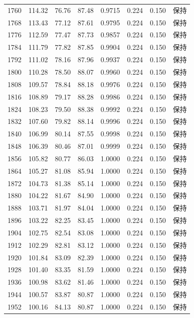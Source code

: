 \begin{longtable}{rrrrrrrr}
1760 & 114.32 & 76.76 & 87.48 & 0.9715 & 0.224 & 0.150 & 保持 \\
1768 & 113.43 & 77.12 & 87.61 & 0.9795 & 0.224 & 0.150 & 保持 \\
1776 & 112.59 & 77.47 & 87.73 & 0.9857 & 0.224 & 0.150 & 保持 \\
1784 & 111.79 & 77.82 & 87.85 & 0.9904 & 0.224 & 0.150 & 保持 \\
1792 & 111.02 & 78.16 & 87.96 & 0.9937 & 0.224 & 0.150 & 保持 \\
1800 & 110.28 & 78.50 & 88.07 & 0.9960 & 0.224 & 0.150 & 保持 \\
1808 & 109.57 & 78.84 & 88.18 & 0.9976 & 0.224 & 0.150 & 保持 \\
1816 & 108.89 & 79.17 & 88.28 & 0.9986 & 0.224 & 0.150 & 保持 \\
1824 & 108.23 & 79.50 & 88.38 & 0.9992 & 0.224 & 0.150 & 保持 \\
1832 & 107.60 & 79.82 & 88.14 & 0.9996 & 0.224 & 0.150 & 保持 \\
1840 & 106.99 & 80.14 & 87.55 & 0.9998 & 0.224 & 0.150 & 保持 \\
1848 & 106.39 & 80.46 & 87.01 & 0.9999 & 0.224 & 0.150 & 保持 \\
1856 & 105.82 & 80.77 & 86.03 & 1.0000 & 0.224 & 0.150 & 保持 \\
1864 & 105.27 & 81.08 & 85.94 & 1.0000 & 0.224 & 0.150 & 保持 \\
1872 & 104.73 & 81.38 & 85.14 & 1.0000 & 0.224 & 0.150 & 保持 \\
1880 & 104.22 & 81.67 & 84.90 & 1.0000 & 0.224 & 0.150 & 保持 \\
1888 & 103.71 & 81.97 & 84.04 & 1.0000 & 0.224 & 0.150 & 保持 \\
1896 & 103.22 & 82.25 & 83.45 & 1.0000 & 0.224 & 0.150 & 保持 \\
1904 & 102.75 & 82.54 & 83.08 & 1.0000 & 0.224 & 0.150 & 保持 \\
1912 & 102.29 & 82.81 & 83.12 & 1.0000 & 0.224 & 0.150 & 保持 \\
1920 & 101.84 & 83.09 & 82.39 & 1.0000 & 0.224 & 0.150 & 保持 \\
1928 & 101.40 & 83.35 & 81.59 & 1.0000 & 0.224 & 0.150 & 保持 \\
1936 & 100.98 & 83.62 & 81.46 & 1.0000 & 0.224 & 0.150 & 保持 \\
1944 & 100.57 & 83.87 & 80.87 & 1.0000 & 0.224 & 0.150 & 保持 \\
1952 & 100.16 & 84.13 & 80.87 & 1.0000 & 0.224 & 0.150 & 保持 \\

\end{longtable}
